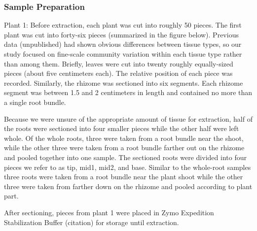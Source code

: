 \subsubsection{Sample Preparation}

Plant 1: Before extraction, each plant was cut into roughly 50 pieces. The first plant was cut into forty-six pieces (summarized in the figure below). Previous data (unpublished) had shown obvious differences between tissue types, so our study focused on fine-scale community variation within each tissue type rather than among them. Briefly, leaves were cut into twenty roughly equally-sized pieces (about five centimeters each). The relative position of each piece was recorded. Similarly, the rhizome was sectioned into six segments. Each rhizome segment was between 1.5 and 2 centimeters in length and contained no more than a single root bundle.
    
Because we were unsure of the appropriate amount of tissue for extraction, half of the roots were sectioned into four smaller pieces while the other half were left whole. Of the whole roots, three were taken from a root bundle near the shoot, while the other three were taken from a root bundle farther out on the rhizome and pooled together into one sample. The sectioned roots were divided into four pieces we refer to as tip, mid1, mid2, and base. Similar to the whole-root samples three roots were taken from a root bundle near the plant shoot while the other three were taken from farther down on the rhizome and pooled according to plant part.

After sectioning, pieces from plant 1 were placed in Zymo Expedition Stabilization Buffer (citation) for storage until extraction.    